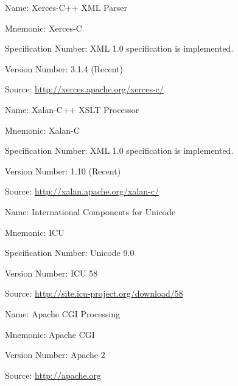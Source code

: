 \begin{description}
  \item {
    \begin{description}
      \item Name: Xerces-C++ XML Parser
      \item Mnemonic: Xerces-C
      \item Specification Number: XML 1.0 specification is implemented.
      \item Version Number: 3.1.4 (Recent)
      \item Source: \url{http://xerces.apache.org/xerces-c/}
    \end{description}
  }
  \item {
    \begin{description}
      \item Name: Xalan-C++ XSLT Processor 
      \item Mnemonic: Xalan-C
      \item Specification Number: XML 1.0 specification is implemented.
      \item Version Number: 1.10 (Recent)
      \item Source: \url{http://xalan.apache.org/xalan-c/}
    \end{description}
  }
  \item {
    \begin{description}
      \item Name: International Components for Unicode
      \item Mnemonic: ICU
      \item Specification Number: Unicode 9.0
      \item Version Number: ICU 58
      \item Source: \url{http://site.icu-project.org/download/58}
    \end{description}
  }
   \item {
     \begin{description}
       \item Name: Apache CGI Processing
       \item Mnemonic: Apache CGI
       \item Version Number: Apache 2
       \item Source: \url{http://apache.org}
     \end{description}
  }
\end{description}


